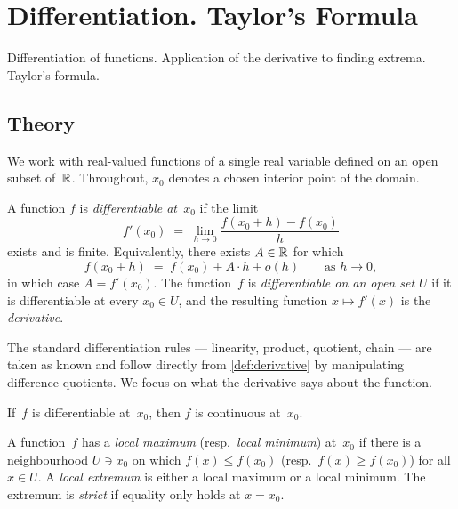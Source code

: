 
\section{Differentiation. Taylor's Formula}
\label{sec:1.1.09-derivatives-taylor}

\begin{ticket}
Differentiation of functions. Application of the derivative to finding extrema. Taylor's formula.
\end{ticket}

\subsection*{Theory}

We work with real-valued functions of a single real variable defined
on an open subset of~$\mathbb{R}$. Throughout, $x_0$ denotes a chosen interior
point of the domain.

\begin{definition}
\label{def:derivative}
A function $f$ is \emph{differentiable at~$x_0$} if the limit
\[
  f'(x_0) \;=\; \lim_{h \to 0} \frac{f(x_0 + h) - f(x_0)}{h}
\]
exists and is finite. Equivalently, there exists $A \in \mathbb{R}$ for which
\[
  f(x_0 + h) \;=\; f(x_0) + A \cdot h + o(h)
  \qquad \text{as } h \to 0,
\]
in which case $A = f'(x_0)$. The function~$f$ is \emph{differentiable
on an open set $U$} if it is differentiable at every $x_0 \in U$, and
the resulting function $x \mapsto f'(x)$ is the \emph{derivative}.
\end{definition}

The standard differentiation rules — linearity, product, quotient,
chain — are taken as known and follow directly from
\cref{def:derivative} by manipulating difference quotients. We focus
on what the derivative says about the function.

\begin{proposition}
\label{prop:diff-implies-cont}
If~$f$ is differentiable at~$x_0$, then $f$ is continuous at~$x_0$.
\end{proposition}

\begin{definition}
\label{def:local-extremum}
A function~$f$ has a \emph{local maximum} (resp.\ \emph{local minimum})
at~$x_0$ if there is a neighbourhood $U \ni x_0$ on which
$f(x) \le f(x_0)$ (resp.\ $f(x) \ge f(x_0)$) for all $x \in U$. A
\emph{local extremum} is either a local maximum or a local minimum.
The extremum is \emph{strict} if equality only holds at $x = x_0$.
\end{definition}

